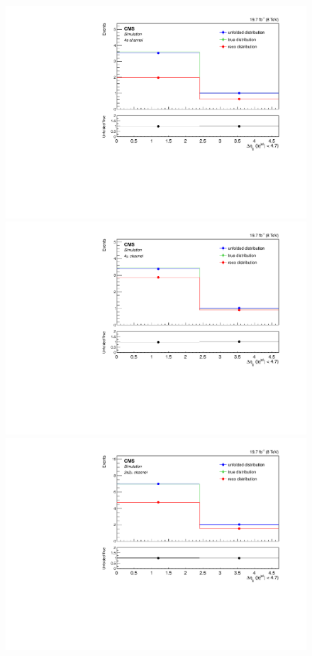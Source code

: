 \begin{figure}[hbtp]
\begin{center}
    \includegraphics[width=0.8\cmsFigWidth]{Figures/Unfolding/MCTests/Deta_ZZTo4e_MadMatrix_MadDistr_HalfSample_fr}     
    \includegraphics[width=0.8\cmsFigWidth]{Figures/Unfolding/MCTests/Deta_ZZTo4m_MadMatrix_MadDistr_HalfSample_fr}     
    \includegraphics[width=0.8\cmsFigWidth]{Figures/Unfolding/MCTests/Deta_ZZTo2e2m_MadMatrix_MadDistr_HalfSample_fr}     

\end{center}
\end{figure}
